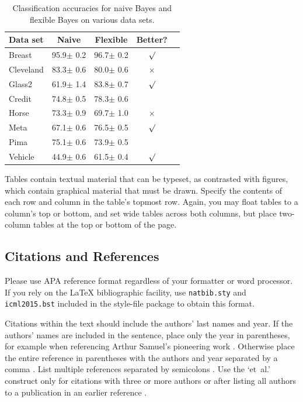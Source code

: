 \documentclass{article}
\begin{document}
\begin{table}[t]
\caption{Classification accuracies for naive Bayes and flexible 
Bayes on various data sets.}
\label{sample-table}
\vskip 0.15in
\begin{center}
\begin{small}
\begin{sc}
\begin{tabular}{lcccr}
\hline
\abovespace\belowspace
Data set & Naive & Flexible & Better? \\
\hline
\abovespace
Breast    & 95.9$\pm$ 0.2& 96.7$\pm$ 0.2& $\surd$ \\
Cleveland & 83.3$\pm$ 0.6& 80.0$\pm$ 0.6& $\times$\\
Glass2    & 61.9$\pm$ 1.4& 83.8$\pm$ 0.7& $\surd$ \\
Credit    & 74.8$\pm$ 0.5& 78.3$\pm$ 0.6&         \\
Horse     & 73.3$\pm$ 0.9& 69.7$\pm$ 1.0& $\times$\\
Meta      & 67.1$\pm$ 0.6& 76.5$\pm$ 0.5& $\surd$ \\
Pima      & 75.1$\pm$ 0.6& 73.9$\pm$ 0.5&         \\
\belowspace
Vehicle   & 44.9$\pm$ 0.6& 61.5$\pm$ 0.4& $\surd$ \\
\hline
\end{tabular}
\end{sc}
\end{small}
\end{center}
\vskip -0.1in
\end{table}

Tables contain textual material that can be typeset, as contrasted 
with figures, which contain graphical material that must be drawn. 
Specify the contents of each row and column in the table's topmost
row. Again, you may float tables to a column's top or bottom, and set
wide tables across both columns, but place two-column tables at the
top or bottom of the page.
 
\subsection{Citations and References} 

Please use APA reference format regardless of your formatter
or word processor. If you rely on the \LaTeX\/ bibliographic 
facility, use {\tt natbib.sty} and {\tt icml2015.bst} 
included in the style-file package to obtain this format.

Citations within the text should include the authors' last names and
year. If the authors' names are included in the sentence, place only
the year in parentheses, for example when referencing Arthur Samuel's
pioneering work . Otherwise place the entire
reference in parentheses with the authors and year separated by a
comma \cite{Samuel59}. List multiple references separated by
semicolons \cite{kearns89,Samuel59,mitchell80}. Use the `et~al.'
construct only for citations with three or more authors or after
listing all authors to a publication in an earlier reference \cite{MachineLearningI}.
\end{document}
